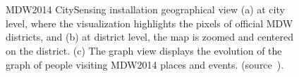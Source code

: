 \begin{figure}[p]
\centering
{}\\
\\
\caption{MDW2014 CitySensing installation geographical view (a) at city level, where the visualization highlights the pixels of official MDW districts, and (b) at district level, the map is zoomed and centered on the district. (c) The graph view displays the evolution of the graph of people visiting MDW2014 places and events. (source~\cite{DBLP:journals/ieeemm/BalduiniVALAC15}).}
\label{fig:mdw-2014-vis}
\end{figure}

